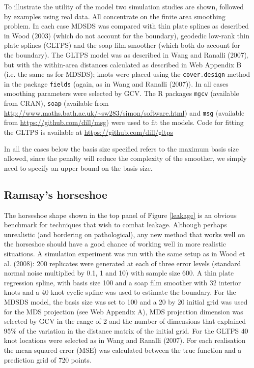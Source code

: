 \documentclass[useAMS, referee]{biom}
\begin{document}
To illustrate the utility of the model two simulation studies are shown, followed by examples using real data. All concentrate on the finite area smoothing problem. In each case MDSDS was compared with thin plate splines as described in Wood (2003) (which do not account for the boundary), geodedic low-rank thin plate splines (GLTPS) and the soap film smoother (which both do account for the boundary). The GLTPS model was as described in Wang and Ranalli (2007), but with the within-area distances calculated as described in Web Appendix B (i.e. the same as for MDSDS); knots were placed using the \texttt{cover.design} method in the package \texttt{fields} (again, as in Wang and Ranalli (2007)). In all cases smoothing parameters were selected by GCV. The \textsf{R} packages \texttt{mgcv} (available from CRAN), \texttt{soap} (available from
\url{http://www.maths.bath.ac.uk/~sw283/simon/software.html}) and \texttt{msg} (available from \url{https://github.com/dill/msg}) were used to fit the models. Code for fitting the GLTPS is available at \url{https://github.com/dill/gltps}

In all the cases below the basis size specified refers to the maximum basis size allowed, since the penalty will reduce the complexity of the smoother, we simply need to specify an upper bound on the basis size.


\subsection{Ramsay's horseshoe}

The horseshoe shape shown in the top panel of Figure \ref{leakage} is an obvious benchmark for techniques that wish to combat leakage. Although perhaps unrealistic (and bordering on pathological), any new method that works well on the horseshoe should have a good chance of working well in more realistic situations. A simulation experiment was run with the same setup as in Wood et al. (2008): 200 replicates were generated at each of three error levels (standard normal noise multiplied by 0.1, 1 and 10) with sample size 600. A thin plate regression spline, with basis size 100 and a soap film smoother with 32 interior knots  and a 40 knot cyclic  spline was used to estimate the boundary. For the MDSDS model, the basis size was set to 100 and a 20 by 20 initial grid was used for the MDS projection (see Web Appendix A), MDS projection dimension was selected by GCV in the range of 2 and the number of dimensions that explained 95\% of the variation in the distance matrix of the initial grid. For the GLTPS 40 knot locations were selected as in Wang and Ranalli (2007). For each realisation the mean squared error (MSE) was calculated between the true function and a prediction grid of 720 points.
\end{document}
